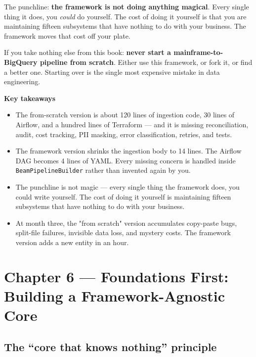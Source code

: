 \documentclass[
  11pt,
  british,
  oneside]{book}
\begin{document}
The punchline: \textbf{the framework is not doing anything magical}.
Every single thing it does, you \emph{could} do yourself. The cost of
doing it yourself is that you are maintaining fifteen subsystems that
have nothing to do with your business. The framework moves that cost off
your plate.

If you take nothing else from this book: \textbf{never start a
mainframe-to-BigQuery pipeline from scratch}. Either use this framework,
or fork it, or find a better one. Starting over is the single most
expensive mistake in data engineering.

\begin{takeaways}
\textbf{Key takeaways}
\begin{itemize}
  \item The from-scratch version is about 120 lines of ingestion code, 30 lines of Airflow, and a hundred lines of Terraform — and it is missing reconciliation, audit, cost tracking, PII masking, error classification, retries, and tests.
  \item The framework version shrinks the ingestion body to 14 lines. The Airflow DAG becomes 4 lines of YAML. Every missing concern is handled inside \texttt{BeamPipelineBuilder} rather than invented again by you.
  \item The punchline is not magic — every single thing the framework does, you could write yourself. The cost of doing it yourself is maintaining fifteen subsystems that have nothing to do with your business.
  \item At month three, the "from scratch" version accumulates copy-paste bugs, split-file failures, invisible data loss, and mystery costs. The framework version adds a new entity in an hour.
\end{itemize}
\end{takeaways}

\newpage

\hypertarget{chapter-6-foundations-first-building-a-framework-agnostic-core}{%
\chapter{Chapter 6 --- Foundations First: Building a Framework-Agnostic
Core}\label{chapter-6-foundations-first-building-a-framework-agnostic-core}}

\hypertarget{the-core-that-knows-nothing-principle}{%
\section{The ``core that knows nothing''
principle}\label{the-core-that-knows-nothing-principle}}
\end{document}
